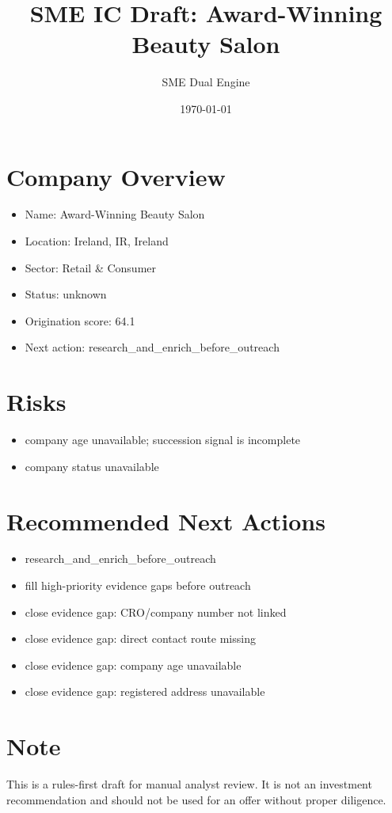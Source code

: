 \documentclass[11pt,a4paper]{article}
\title{SME IC Draft: Award-Winning Beauty Salon}
\author{SME Dual Engine}
\date{\today}
\begin{document}
\maketitle
\section*{Company Overview}
\begin{itemize}[leftmargin=1.4em]
\item Name: Award-Winning Beauty Salon
\item Location: Ireland, IR, Ireland
\item Sector: Retail \& Consumer
\item Status: unknown
\item Origination score: 64.1
\item Next action: research\_and\_enrich\_before\_outreach
\end{itemize}
\section*{Risks}
\begin{itemize}[leftmargin=1.4em]
\item company age unavailable; succession signal is incomplete
\item company status unavailable
\end{itemize}
\section*{Recommended Next Actions}
\begin{itemize}[leftmargin=1.4em]
\item research\_and\_enrich\_before\_outreach
\item fill high-priority evidence gaps before outreach
\item close evidence gap: CRO/company number not linked
\item close evidence gap: direct contact route missing
\item close evidence gap: company age unavailable
\item close evidence gap: registered address unavailable
\end{itemize}
\section*{Note}
This is a rules-first draft for manual analyst review. It is not an investment
recommendation and should not be used for an offer without proper diligence.
\end{document}
